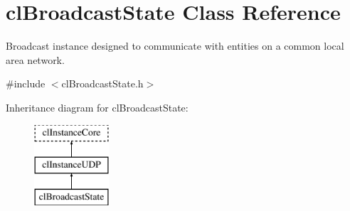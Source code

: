 \hypertarget{classcl_broadcast_state}{
\section{clBroadcastState Class Reference}
\label{classcl_broadcast_state}
}


Broadcast instance designed to communicate with entities on a common local area network.  




{\ttfamily \#include $<$clBroadcastState.h$>$}

Inheritance diagram for clBroadcastState:\begin{figure}[H]
\begin{center}
\leavevmode
\includegraphics[height=3.000000cm]{classcl_broadcast_state}
\end{center}
\end{figure}
